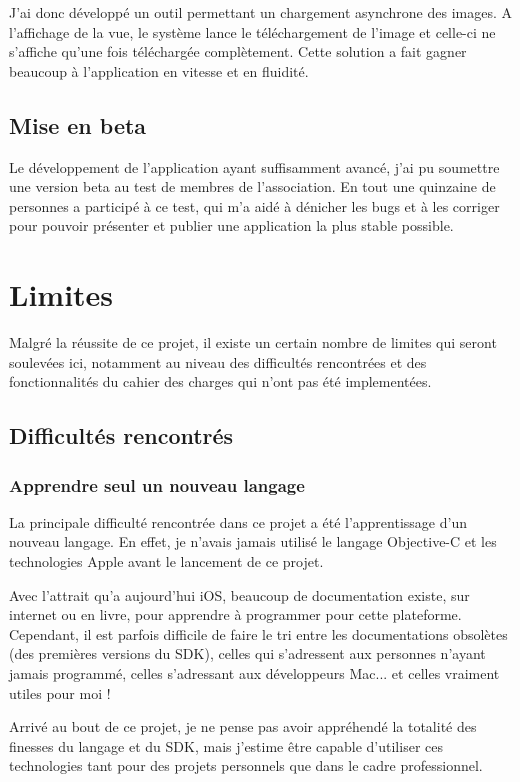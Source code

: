 \documentclass[11pt, french]{report}
\begin{document}
J'ai donc développé un outil permettant un chargement asynchrone des images. A l'affichage de la vue, le système lance le téléchargement de l'image et celle-ci ne s'affiche qu'une fois téléchargée complètement. Cette solution a fait gagner beaucoup à l'application en vitesse et en fluidité.

\subsection{Mise en beta}

Le développement de l'application ayant suffisamment avancé, j'ai pu soumettre une version beta au test de membres de l'association. En tout une quinzaine de personnes a participé à ce test, qui m'a aidé à dénicher les bugs et à les corriger pour pouvoir présenter et publier une application la plus stable possible.

\section{Limites}

Malgré la réussite de ce projet, il existe un certain nombre de limites qui seront soulevées ici, notamment au niveau des difficultés rencontrées et des fonctionnalités du cahier des charges qui n'ont pas été implementées.

\subsection{Difficultés rencontrés}

\subsubsection{Apprendre seul un nouveau langage}

La principale difficulté rencontrée dans ce projet a été l'apprentissage d'un nouveau langage. En effet, je n'avais jamais utilisé le langage Objective-C et les technologies Apple avant le lancement de ce projet.

Avec l'attrait qu'a aujourd'hui iOS, beaucoup de documentation existe, sur internet ou en livre, pour apprendre à programmer pour cette plateforme. Cependant, il est parfois difficile de faire le tri entre les documentations obsolètes (des premières versions du SDK), celles qui s'adressent aux personnes n'ayant jamais programmé, celles s'adressant aux développeurs Mac... et celles vraiment utiles pour moi !

Arrivé au bout de ce projet, je ne pense pas avoir appréhendé la totalité des finesses du langage et du SDK, mais j'estime être capable d'utiliser ces technologies tant pour des projets personnels que dans le cadre professionnel.
\end{document}
